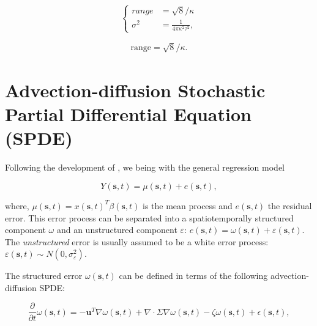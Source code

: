 \documentclass[letterpaper,portrait,11pt]{scrartcl}
\numberwithin{equation}{section}    %
\numberwithin{figure}{section}    %
\numberwithin{table}{section}       %
\begin{document}
\begin{appendices}
\begin{equation}
\label{eq:inlaRange}
\begin{cases}
  range    &=  \sqrt{8} / \kappa \\
  \sigma^2 &=  \frac{1}{4 \pi \kappa^2 \tau^2 },
\end{cases}
\end{equation}


\begin{eqnarray*}
\text{range} = \sqrt{8} / \kappa .
\end{eqnarray*}





\section{Advection-diffusion Stochastic Partial Differential Equation (SPDE)}
\label{advectionDiffsionSPDEsolution}



Following the development of \textcite{sigrist2015stochastic}, we being with the general regression model

\begin{equation}
Y(\bm{s},t) = \mu(\bm{s},t) + e(\bm{s},t) ,
\end{equation}

where, $\mu(\bm{s},t) = x(\bm{s},t)^{T} \beta(\bm{s},t)$ is the mean process and $e(\bm{s},t)$ the residual error. This error process can be separated into a spatiotemporally structured component $\omega$ and an unstructured component $\varepsilon$: $e(\bm{s},t) = \omega(\bm{s},t) +  \varepsilon(\bm{s},t)$. The \textit{unstructured} error is usually assumed to be a white error process: $\varepsilon(\bm{s},t) \sim N(0, \sigma^2_\varepsilon)$.

The structured error $\omega(\bm{s},t)$ can be defined in terms of the following advection-diffusion SPDE:

\begin{equation}
\frac{\partial}{\partial t} \omega(\bm{s},t) = - \bm{u}^T \nabla \omega(\bm{s},t)
+ \nabla \cdotp \Sigma \nabla \omega(\bm{s},t) - \zeta  \omega(\bm{s},t) + \epsilon(\bm{s},t),
\end{equation}


\end{appendices}
\end{document}
